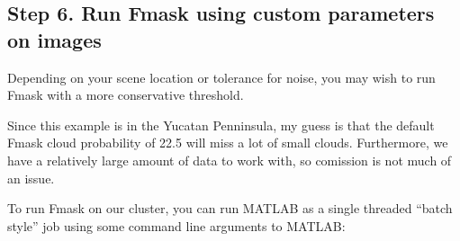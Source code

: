 \documentclass{article}
\begin{document}
    \subsection{Step 6. Run Fmask using custom parameters on images}

Depending on your scene location or tolerance for noise, you may wish to
run Fmask with a more conservative threshold.

Since this example is in the Yucatan Penninsula, my guess is that the
default Fmask cloud probability of 22.5 will miss a lot of small clouds.
Furthermore, we have a relatively large amount of data to work with, so
comission is not much of an issue.

To run Fmask on our cluster, you can run MATLAB as a single threaded
``batch style'' job using some command line arguments to MATLAB:
\end{document}
